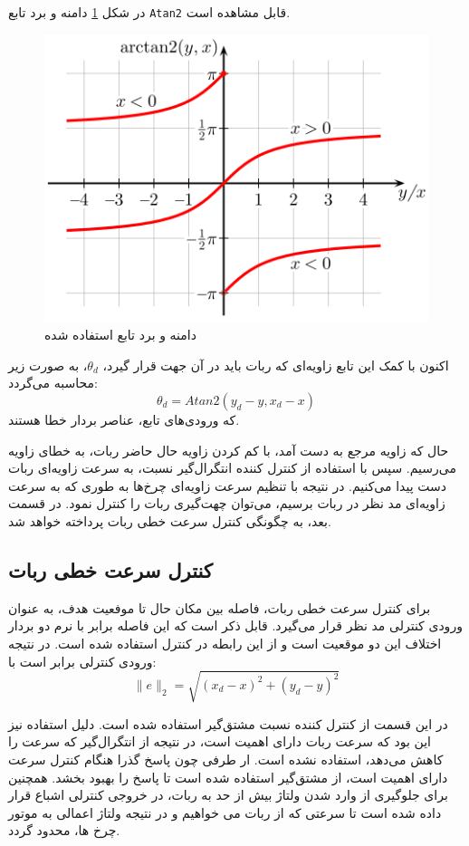 در شکل \ref{Fig atan2} دامنه و برد تابع \verb|Atan2| قابل مشاهده است.
\begin{figure}[!h] 
	\centering
	\includegraphics[scale=0.8]{Images/atan2.png}
	\caption{دامنه و برد تابع استفاده شده} \label{Fig atan2}
\end{figure}

اکنون با کمک این تابع زاویه‌ای که ربات باید در آن جهت قرار گیرد، $\theta_d$، به صورت زیر محاسبه می‌گردد:
\begin{equation}
\theta_d = Atan2(y_d - y, x_d - x)
\end{equation}
که ورودی‌های تابع، عناصر بردار خطا هستند.

حال که زاویه مرجع به دست آمد، با کم کردن زاویه حال حاضر ربات، به خطای زاویه می‌رسیم. سپس با استفاده از کنترل کننده انتگرال‌گیر نسبت، به سرعت زاویه‌ای ربات دست پیدا می‌کنیم. در نتیجه با تنظیم سرعت زاویه‌ای چرخ‌ها به طوری که به سرعت زاویه‌ای مد نظر در ربات برسیم، می‌توان چهت‌گیری ربات را کنترل نمود. در قسمت بعد، به چگونگی کنترل سرعت خطی ربات پرداخته خواهد شد. 

\subsection{کنترل سرعت خطی ربات}
برای کنترل سرعت خطی ربات، فاصله بین مکان حال تا موفعیت هدف، به عنوان ورودی کنترلی مد نظر قرار می‌گیرد. قابل ذکر است که این فاصله برابر با نرم دو بردار اختلاف این دو موقعیت است و از این رابطه در کنترل استفاده شده است. در نتیجه ورودی کنترلی برابر است با:
\begin{equation}
\|e\|_2 = \sqrt{(x_d - x)^{2} + (y_d - y)^{2}}
\end{equation}

در این قسمت از کنترل کننده نسبت مشتق‌گیر استفاده شده است. دلیل استفاده نیز این بود که سرعت ربات دارای اهمیت است، در نتیجه از انتگرال‌گیر که سرعت را کاهش می‌دهد، استفاده نشده است. ار طرفی چون پاسخ گذرا هنگام کنترل سرعت دارای اهمیت است، از مشتق‌گیر استفاده شده است تا پاسخ را بهبود بخشد. همچنین برای جلوگیری از وارد شدن ولتاژ بیش از حد به ربات، در خروجی کنترلی اشباع قرار داده شده است تا سرعتی که از ربات می خواهیم و در نتیجه ولتاژ اعمالی به موتور چرخ ها، محدود گردد.

